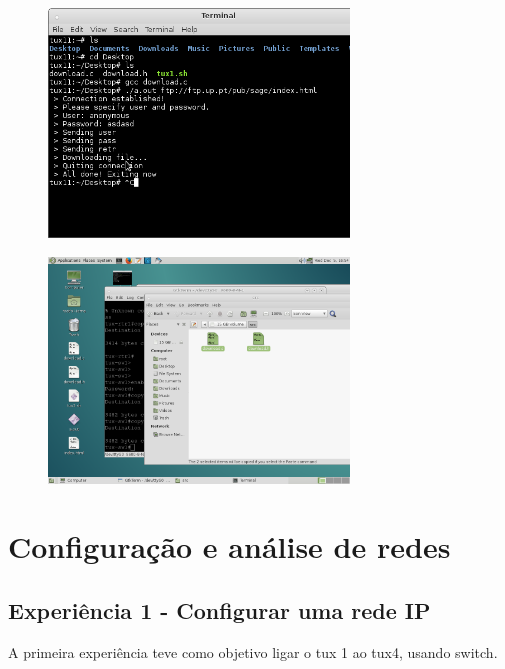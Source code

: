 \documentclass{article}
\begin{document}
\begin{figure}[h]
\centering
\includegraphics[width=8cm]{images/screen_dl.png}
\end{figure}

\begin{figure}[H]
\centering
\includegraphics[width=8cm]{images/screen_dl_2.png}
\end{figure}

\begin{figure}
\end{figure}
\section{Configuração e análise de redes}
\subsection{Experiência 1 - Configurar uma rede IP}

A primeira experiência teve como objetivo ligar o tux 1 ao tux4, usando switch. 
\end{document}
